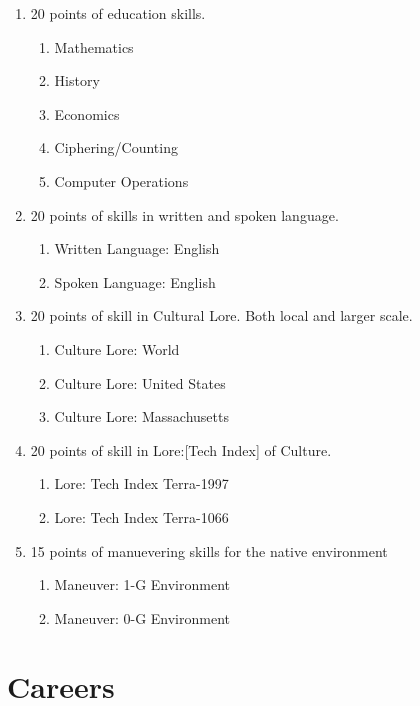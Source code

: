\begin{enumerate}
	\item 20 points of education skills.
	\begin{enumerate}
	    \item{Mathematics}
	    \item{History}
	    \item{Economics}
	    \item{Ciphering/Counting}
	    \item{Computer Operations}	    
	\end{enumerate}

	\item 20 points of skills in written and spoken language.
	\begin{enumerate}
	    \item{Written Language: English} 
	    \item{Spoken Language: English}
	\end{enumerate}

	\item 20 points of skill in Cultural Lore. Both local and larger scale.
	\begin{enumerate}
	    \item{Culture Lore: World} 
	    \item{Culture Lore: United States} 
	    \item{Culture Lore: Massachusetts} 
	\end{enumerate}

	\item 20 points of skill in Lore:[Tech Index] of Culture.
	\begin{enumerate}
	    \item{Lore: Tech Index Terra-1997}
	    \item{Lore: Tech Index Terra-1066} 	    
	\end{enumerate}
	
	\item 15 points of manuevering skills for the native environment
	\begin{enumerate}
	    \item{Maneuver: 1-G Environment}
	    \item{Maneuver: 0-G Environment}
	\end{enumerate}
\end{enumerate}

\section{Careers}

